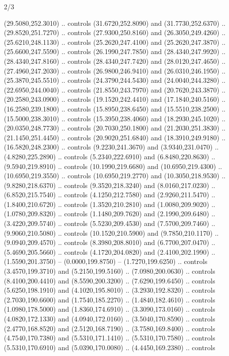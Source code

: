 \begin{flagdescription}{2/3}
\begin{scope}[xshift=0.5\flaglength,yshift=0.5\flagwidth,scale=\stretchfactor]
\begin{scope}[scale=0.001645\flagwidth,yshift=65mm,xshift=-63mm]
\begin{scope}[y=0.80pt, x=0.80pt, yscale=-1,]
\begin{scope}[cm={{1.33333,0.0,0.0,1.33333,(0.0,1e-05)}}]
  (29.5080,252.3010) .. controls (31.6720,252.8090) and (31.7730,252.6370) ..
  (29.8520,251.7270) .. controls (27.9300,250.8160) and (26.3050,249.4260) ..
  (25.6210,248.1130) .. controls (25.2620,247.4100) and (25.2620,247.3870) ..
  (25.6600,247.5590) .. controls (26.1990,247.7850) and (28.4340,247.9920) ..
  (28.4340,247.8160) .. controls (28.4340,247.7420) and (28.0120,247.4650) ..
  (27.4960,247.2030) .. controls (26.9800,246.9410) and (26.0310,246.1950) ..
  (25.3870,245.5510) .. controls (24.3790,244.5430) and (24.0040,244.3280) ..
  (22.6950,244.0040) .. controls (21.8550,243.7970) and (20.7620,243.3870) ..
  (20.2580,243.0900) .. controls (19.1520,242.4410) and (17.1840,240.5160) ..
  (16.2580,239.1800) .. controls (15.8950,238.6450) and (15.5510,238.2500) ..
  (15.5000,238.3010) .. controls (15.3950,238.4060) and (18.2930,245.1020) ..
  (20.0350,248.7730) .. controls (20.7030,250.1800) and (21.2030,251.3830) ..
  (21.1450,251.4450) .. controls (20.9020,251.6840) and (18.3910,249.9180) ..
  (16.5820,248.2300) .. controls (9.2230,241.3670) and (3.9340,231.0470) ..
  (4.8280,225.2890) .. controls (5.2340,222.6910) and (6.8480,220.8630) ..
  (9.5940,219.8910) .. controls (10.1990,219.6680) and (10.6950,219.4300) ..
  (10.6950,219.3550) .. controls (10.6950,219.2770) and (10.3050,218.9530) ..
  (9.8280,218.6370) .. controls (9.3520,218.3240) and (8.0160,217.0230) ..
  (6.8520,215.7540) .. controls (4.1250,212.7580) and (2.9260,211.5470) ..
  (1.8400,210.6720) .. controls (1.3520,210.2810) and (1.0080,209.9020) ..
  (1.0780,209.8320) .. controls (1.1480,209.7620) and (2.1990,209.6480) ..
  (3.4220,209.5740) .. controls (5.5230,209.4530) and (7.5700,209.7460) ..
  (9.9060,210.5080) .. controls (10.1520,210.5900) and (9.7850,210.1170) ..
  (9.0940,209.4570) .. controls (8.3980,208.8010) and (6.7700,207.0470) ..
  (5.4690,205.5660) .. controls (4.1720,204.0820) and (2.4100,202.1990) ..
  (1.5590,201.3750) -- (0.0000,199.8750) -- (1.7270,199.6250) .. controls
  (3.4570,199.3710) and (5.2150,199.5160) .. (7.0980,200.0630) .. controls
  (8.4100,200.4410) and (8.5590,200.3200) .. (7.6290,199.6450) .. controls
  (5.6250,198.1910) and (4.1020,195.8010) .. (3.2930,192.8320) .. controls
  (2.7030,190.6600) and (1.7540,185.2270) .. (1.4840,182.4610) .. controls
  (1.0980,178.5000) and (1.8360,174.6910) .. (3.3090,173.0160) .. controls
  (4.0820,172.1330) and (4.0940,172.0160) .. (3.5040,170.8590) .. controls
  (2.4770,168.8520) and (2.5120,168.7190) .. (3.7580,169.8400) .. controls
  (4.7540,170.7380) and (5.5310,171.1410) .. (5.5310,170.7580) .. controls
  (5.5310,170.6910) and (5.0390,170.0080) .. (4.4450,169.2380) .. controls

\end{scope}
\end{scope}
\end{scope}
\end{scope}
\end{flagdescription}
